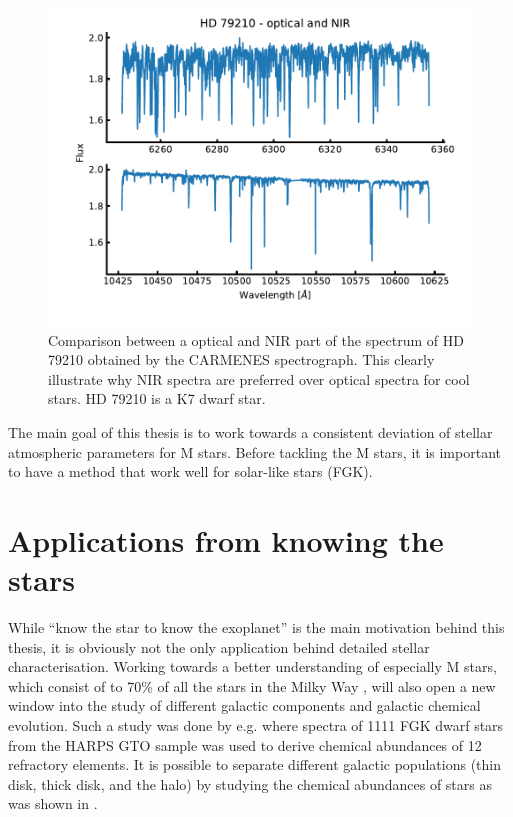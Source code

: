 \begin{figure}[htpb!]
    \centering
    \includegraphics[width=1.0\linewidth]{figures/opticalVSnir.pdf}
    \caption{Comparison between a optical and NIR part of the spectrum of HD 79210 obtained by
             the CARMENES spectrograph. This clearly illustrate why NIR spectra are preferred over
             optical spectra for cool stars. HD 79210 is a K7 dwarf star.}
    \label{fig:opticalVSnir}
\end{figure}

The main goal of this thesis is to work towards a consistent deviation of stellar atmospheric
parameters for M stars. Before tackling the M stars, it is important to have a method that work
well for solar-like stars (FGK).



\section{Applications from knowing the stars}
\label{sec:stars_application}

While ``know the star to know the exoplanet'' is the main motivation behind this thesis, it is
obviously not the only application behind detailed stellar characterisation. Working towards a
better understanding of especially M stars, which consist of to 70\% of all the stars in the Milky
Way \citep{Bochanski2010}, will also open a new window into the study of different galactic
components and galactic chemical evolution. Such a study was done by e.g. \citet{Adibekyan2012}
where spectra of 1111 FGK dwarf stars from the HARPS GTO sample was used to derive chemical
abundances of 12 refractory elements. It is possible to separate different galactic populations
(thin disk, thick disk, and the halo) by studying the chemical abundances of stars as was shown in
\citet{Adibekyan2012}.

